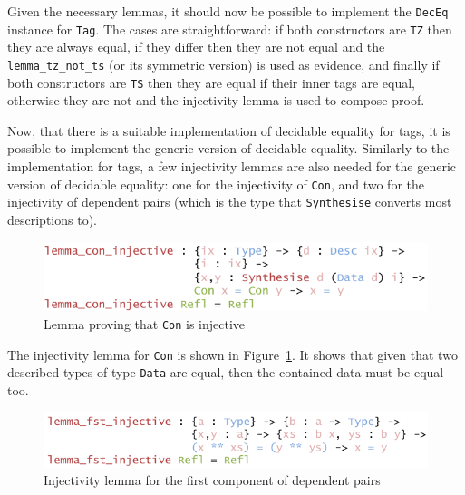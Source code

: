 \documentclass{ituthesis}
\newcommand{\ttconstructor}[1]{\textcolor{constructor-color}{\texttt{#1}}}
\newcommand{\tttype}[1]{\textcolor{type-color}{\texttt{#1}}}
\newcommand{\ttdec}[1]{\textcolor{declared-var-color}{\texttt{#1}}}
\theoremstyle{break}
\begin{document}
Given the necessary lemmas, it should now be possible to implement the \tttype{DecEq} instance for \tttype{Tag}.
The cases are straightforward: if both constructors are \ttconstructor{TZ} then they are always equal, if they differ then they are not equal
and the \ttdec{lemma\_tz\_not\_ts} (or its symmetric version) is used as evidence, and finally if both constructors are \ttconstructor{TS} then they are equal
if their inner tags are equal, otherwise they are not and the injectivity lemma is used to compose proof.

Now, that there is a suitable implementation of decidable equality for tags, it is possible to implement the generic version of decidable equality.
Similarly to the implementation for tags, a few injectivity lemmas are also needed for the generic version of decidable equality: 
one for the injectivity of \ttconstructor{Con}, and two for the injectivity of dependent pairs (which is the type that \ttdec{Synthesise} converts most descriptions to).

\begin{figure}[ht]
\begin{center}
    \includegraphics[scale=0.5]{Figures/GenericDecEqLemma1.png}
\end{center}
\caption{Lemma proving that \ttconstructor{Con} is injective}
\label{fig:dglem1}
\end{figure}

The injectivity lemma for \ttconstructor{Con} is shown in Figure~\ref{fig:dglem1}.
It shows that given that two described types of type \tttype{Data} are equal, then the contained data must be equal too.

\begin{figure}[ht]
\begin{center}
    \includegraphics[scale=0.5]{Figures/GenericDecEqLemma2.png}
\end{center}
\caption{Injectivity lemma for the first component of dependent pairs}
\label{fig:dglem2}
\end{figure}
\end{document}
